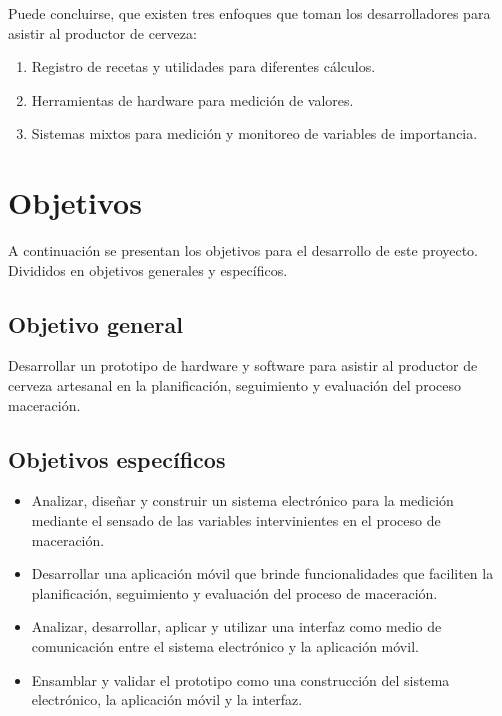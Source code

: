     Puede concluirse, que existen tres enfoques que toman los desarrolladores para asistir al productor de cerveza: 
   
    \begin{enumerate}
            \item Registro de recetas y utilidades para diferentes cálculos.
            \item Herramientas de hardware para medición de valores.
            \item Sistemas mixtos para medición y monitoreo de variables de importancia.
    \end{enumerate}

\section{Objetivos}
\label{secccionObjetivos}
    \par
    A continuación se presentan los objetivos para el desarrollo de este proyecto. Divididos en objetivos generales y específicos.

    \subsection{Objetivo general}
        \par
        Desarrollar un prototipo de hardware y software para asistir al productor de cerveza artesanal en la planificación, seguimiento y evaluación del proceso maceración. 
    \subsection{Objetivos específicos}
        \begin{itemize}
            \item Analizar, diseñar y construir un sistema electrónico para la medición mediante el sensado de las variables intervinientes en el proceso de maceración.
            
            \item Desarrollar una aplicación móvil que brinde funcionalidades que faciliten la planificación, seguimiento y evaluación del proceso de maceración.
            
            \item Analizar, desarrollar, aplicar y utilizar una interfaz como medio de comunicación entre el sistema electrónico y la aplicación móvil.
            
            \item Ensamblar y validar el prototipo como una construcción del sistema electrónico, la aplicación móvil y la interfaz.
        \end{itemize}
 
